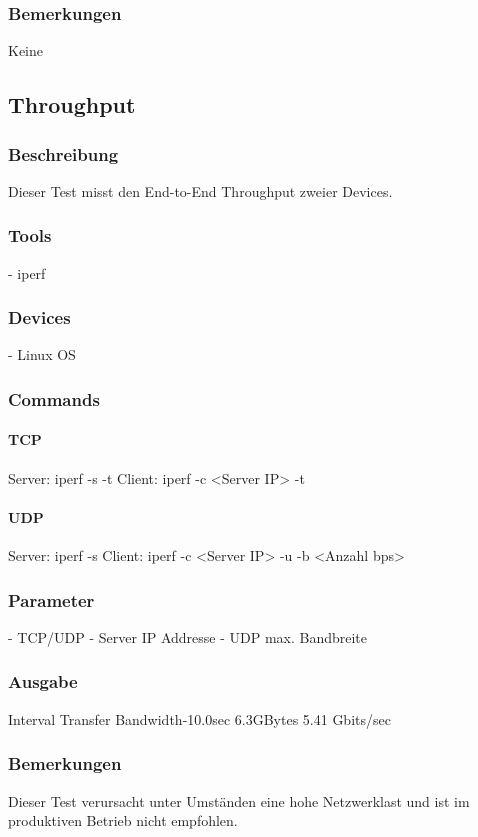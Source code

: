 \documentclass[a4,12pt]{scrartcl}
\begin{document}
\subsubsection{Bemerkungen}
Keine

\subsection{Throughput}
\subsubsection{Beschreibung}
Dieser Test misst den End-to-End Throughput zweier Devices.
\subsubsection{Tools}
- iperf
\subsubsection{Devices}
- Linux OS
\subsubsection{Commands}
\paragraph{TCP}
Server: iperf -s -t
Client: iperf -c <Server IP> -t

\paragraph{UDP}
Server: iperf -s 
Client: iperf -c <Server IP> -u -b <Anzahl bps>
\subsubsection{Parameter}
- TCP/UDP
- Server IP Addresse
- UDP max. Bandbreite
\subsubsection{Ausgabe}
Interval	Transfer	Bandwidth-10.0sec	6.3GBytes	5.41 Gbits/sec
\subsubsection{Bemerkungen}
Dieser Test verursacht unter Umständen eine hohe Netzwerklast und ist im produktiven Betrieb nicht empfohlen.
\end{document}
